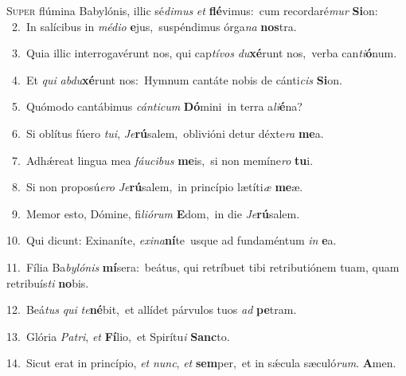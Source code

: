 \lettrine{\initial\textcolor{\initialcolor}{S}}{uper} flúmina Babylónis, illic sé\-\textit{di}\-\textit{mus} \textit{et} \textbf{flé}\-vimus:~\star cum recordaré\textit{mur} \textbf{Si}\-on:\\
{\numbfont\textcolor{\numbcolor}{~2.}}~In salícibus in \textit{mé}\-\textit{di}\textit{o} \textbf{e}\-jus,~\star suspéndimus órga\textit{na} \textbf{nos}\-tra.\par
{\numbfont\textcolor{\numbcolor}{~3.}}~Quia illic interrogavérunt nos, qui cap\-\textit{tí}\-\textit{vos} \textit{du}\-\textbf{xé}runt nos,~\star verba can\-\textit{ti}\-\textbf{ó}num.\par
{\numbfont\textcolor{\numbcolor}{~4.}}~Et \textit{qui} \textit{ab}\-\textit{du}\textbf{xé}runt nos:~\star Hymnum cantáte nobis de cánti\textit{cis} \textbf{Si}\-on.\par
{\numbfont\textcolor{\numbcolor}{~5.}}~Quómodo cantábimus \textit{cán}\-\textit{ti}\textit{cum} \textbf{Dó}\-mini~\star in terra a\-\textit{li}\-\textbf{é}na?\par
{\numbfont\textcolor{\numbcolor}{~6.}}~Si oblítus fúero \textit{tu}\-\textit{i}, \textit{Je}\-\textbf{rú}salem,~\star oblivióni detur déxte\textit{ra} \textbf{me}\-a.\par
{\numbfont\textcolor{\numbcolor}{~7.}}~Adhǽreat lingua mea \textit{fáu}\-\textit{ci}\textit{bus} \textbf{me}\-is,~\star si non memíne\textit{ro} \textbf{tu}\-i.\par
{\numbfont\textcolor{\numbcolor}{~8.}}~Si non proposú\-\textit{e}\-\textit{ro} \textit{Je}\-\textbf{rú}salem,~\star in princípio lætíti\textit{æ} \textbf{me}\-æ.\par
{\numbfont\textcolor{\numbcolor}{~9.}}~Memor esto, Dómine, fi\-\textit{li}\-\textit{ó}\textit{rum} \textbf{E}\-dom,~\star in die \textit{Je}\-\textbf{rú}salem.\par
{\numbfont\textcolor{\numbcolor}{10.}}~Qui dicunt: Exinaníte, \textit{ex}\-\textit{i}\textit{na}\textbf{ní}te~\star usque ad fundaméntum \textit{in} \textbf{e}\-a.\par
{\numbfont\textcolor{\numbcolor}{11.}}~Fília Ba\-\textit{by}\-\textit{ló}\textit{nis} \textbf{mí}\-sera:~\star beátus, qui retríbuet tibi retributiónem tuam, quam retribuís\textit{ti} \textbf{no}\-bis.\par
{\numbfont\textcolor{\numbcolor}{12.}}~Beá\textit{tus} \textit{qui} \textit{te}\-\textbf{né}bit,~\star et allídet párvulos tuos \textit{ad} \textbf{pe}\-tram.\par
{\numbfont\textcolor{\numbcolor}{13.}}~Glória \textit{Pa}\-\textit{tri}, \textit{et} \textbf{Fí}\-lio,~\star et Spirítu\textit{i} \textbf{Sanc}\-to.\par
{\numbfont\textcolor{\numbcolor}{14.}}~Sicut erat in princípio, \textit{et} \textit{nunc}\-, \textit{et} \textbf{sem}\-per,~\star et in sǽcula sæculó\-\textit{rum}\-. \textbf{A}\-men.\par
